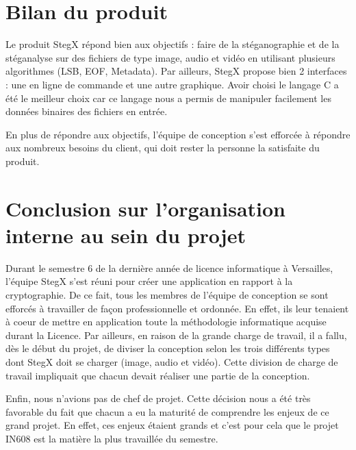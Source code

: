 \documentclass[11pt]{article}
\begin{document}

\section{Bilan du produit}

Le produit StegX répond bien aux objectifs : faire de la stéganographie 
et de la stéganalyse sur des fichiers de type image, audio et vidéo en 
utilisant plusieurs algorithmes (LSB, EOF, Metadata). 
Par ailleurs, StegX propose bien 2 interfaces : une en ligne de commande 
et une autre graphique. 
Avoir choisi le langage C a été le meilleur choix car ce langage nous a 
permis de manipuler facilement les données binaires des fichiers en entrée. 

En plus de répondre aux objectifs, l'équipe de conception s'est efforcée 
à répondre aux nombreux besoins du client, qui doit rester la personne la 
satisfaite du produit. 

\section{Conclusion sur l'organisation interne au sein du projet}

Durant le semestre 6 de la dernière année de licence informatique à Versailles, 
l'équipe StegX s'est réuni pour créer une application en rapport à la 
cryptographie. 
De ce fait, tous les membres de l'équipe de conception se sont efforcés à
travailler de façon professionnelle et ordonnée. En effet, ils leur tenaient 
à coeur de mettre en application toute la méthodologie informatique acquise 
durant la Licence. 
Par ailleurs, en raison de la grande charge de travail, il a fallu, dès le 
début du projet, de diviser la conception selon les trois différents types 
dont StegX doit se charger (image, audio et vidéo). 
Cette division de charge de travail impliquait que chacun devait réaliser 
une partie de la conception. 

Enfin, nous n'avions pas de chef de projet. Cette décision nous a été très 
favorable du fait que chacun a eu la maturité de comprendre les enjeux de 
ce grand projet. En effet, ces enjeux étaient grands et c'est pour cela 
que le projet IN608 est la matière la plus travaillée du semestre. 
\end{document}
